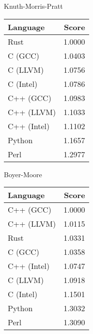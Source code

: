 \begin{subtable}{0.33\textwidth}
    \centering
    \caption{Knuth-Morris-Pratt}
    \label{table:energy:kmp}
    \begin{tabular}{|l|r|}
        \hline
        Language & Score \\
        \hline
        Rust & 1.0000 \\
        C (GCC) & 1.0403 \\
        C (LLVM) & 1.0756 \\
        C (Intel) & 1.0786 \\
        C++ (GCC) & 1.0983 \\
        C++ (LLVM) & 1.1033 \\
        C++ (Intel) & 1.1102 \\
        Python & 1.1657 \\
        Perl & 1.2977 \\
        \hline
    \end{tabular}
\end{subtable}%
\begin{subtable}{0.33\textwidth}
    \centering
    \caption{Boyer-Moore}
    \label{table:energy:boyer_moore}
    \begin{tabular}{|l|r|}
        \hline
        Language & Score \\
        \hline
        C++ (GCC) & 1.0000 \\
        C++ (LLVM) & 1.0115 \\
        Rust & 1.0331 \\
        C (GCC) & 1.0358 \\
        C++ (Intel) & 1.0747 \\
        C (LLVM) & 1.0918 \\
        C (Intel) & 1.1501 \\
        Python & 1.3032 \\
        Perl & 1.3090 \\
        \hline
    \end{tabular}
\end{subtable}%

